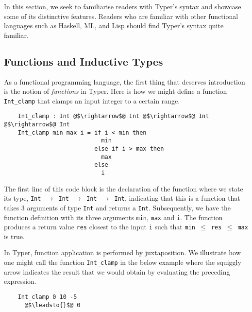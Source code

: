 \documentclass[12pt,twoside,maitrise]{dms}
\theoremstyle{definition}
\numberwithin{equation}{section}
\numberwithin{table}{chapter}
\numberwithin{figure}{chapter}
\newcommand\id[1] {\texttt{#1}}
\newcommand\fn[1] {\texttt{#1}}
\begin{document}
In this section, we seek to familiarise readers with Typer's syntax and
showcase some of its distinctive features. Readers who are familiar with other
functional languages such as Haskell, ML, and Lisp should find Typer's syntax
quite familiar.

\subsection{Functions and Inductive Types}\label{subsec:intro-fn-ind-types}


As a functional programming language, the first thing that deserves
introduction is the notion of \emph{functions} in Typer. Here is how we might
define a function \id{Int\_clamp} that clamps an input integer to a certain
range.

\begin{verbatim}
    Int_clamp : Int @$\rightarrow$@ Int @$\rightarrow$@ Int @$\rightarrow$@ Int
    Int_clamp min max i = if i < min then 
                            min 
                          else if i > max then 
                            max
                          else
                            i
\end{verbatim}

The first line of this code block is the declaration of the function where we
state its type, \fn{Int $\rightarrow$ Int $\rightarrow$ Int $\rightarrow$ Int},
indicating that this is a function that takes 3 arguments of type \id{Int} and
returns a \id{Int}. Subsequently, we have the function definition with its
three arguments \id{min}, \id{max} and \id{i}. The function produces a return
value \id{res} closest to the input \id{i} such that \fn{min $\le$ res $\le$
max} is true.

In Typer, function application is performed by juxtaposition. We illustrate how
one might call the function \id{Int\_clamp} in the below example where the
squiggly arrow indicates the result that we would obtain by evaluating the
preceding expression.

\begin{verbatim}
    Int_clamp 0 10 -5
      @$\leadsto{}$@ 0
\end{verbatim}

\end{document}
